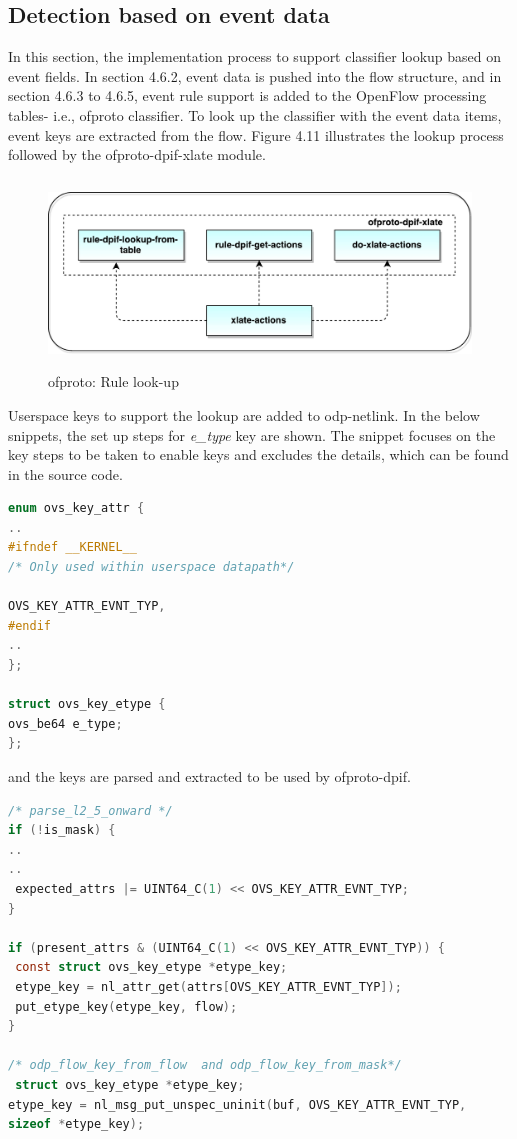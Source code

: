 \subsection{Detection based on event data}
In this section, the implementation process to support classifier lookup based on event fields. In section 4.6.2, event data is pushed into the flow structure, and in section 4.6.3 to 4.6.5, event rule support is added to the OpenFlow processing tables- i.e., ofproto classifier. To look up the classifier with the event data items, event keys are extracted from the flow. Figure 4.11 illustrates the lookup process followed by the ofproto-dpif-xlate module.

\begin{figure}[H]
 \centering
 \caption{ofproto: Rule look-up}
 \includegraphics[height=5cm]{ofproto-dpif-xlate.pdf}
\end{figure}

Userspace keys to support the lookup are added to odp-netlink. In the below snippets, the set up steps for \textit{e_type} key are shown. The snippet focuses on the key steps to be taken to enable keys and excludes the details, which can be found in the source code. \newline

\begin{lstlisting}[language=c]
enum ovs_key_attr {
..
#ifndef __KERNEL__
/* Only used within userspace datapath*/ 

OVS_KEY_ATTR_EVNT_TYP,
#endif
..
};

struct ovs_key_etype {
ovs_be64 e_type;
};

\end{lstlisting}

and the keys are parsed and extracted to be used by ofproto-dpif. \newline
\begin{lstlisting}[language=c]
/* parse_l2_5_onward */
if (!is_mask) {
..
..
 expected_attrs |= UINT64_C(1) << OVS_KEY_ATTR_EVNT_TYP;
}

if (present_attrs & (UINT64_C(1) << OVS_KEY_ATTR_EVNT_TYP)) {
 const struct ovs_key_etype *etype_key; 
 etype_key = nl_attr_get(attrs[OVS_KEY_ATTR_EVNT_TYP]);
 put_etype_key(etype_key, flow);
}

/* odp_flow_key_from_flow  and odp_flow_key_from_mask*/
 struct ovs_key_etype *etype_key;  
etype_key = nl_msg_put_unspec_uninit(buf, OVS_KEY_ATTR_EVNT_TYP,
sizeof *etype_key); 
\end{lstlisting}

